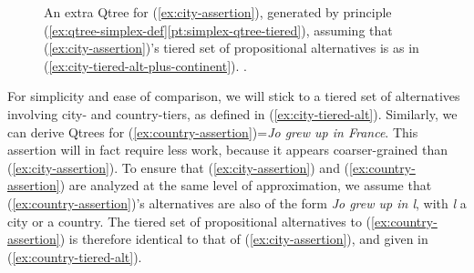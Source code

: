 \begin{exe}
	\label{ex:city-tiered-alt-plus-continent}
\end{exe} 

\begin{figure}[H]
	\centering
	\caption{An extra Qtree for (\ref{ex:city-assertion}), generated by principle (\ref{ex:qtree-simplex-def}\ref{pt:simplex-qtree-tiered}), assuming that (\ref{ex:city-assertion})'s tiered set of propositional alternatives is as in (\ref{ex:city-tiered-alt-plus-continent}). .}\label{fig:city-qtree-tiered-plus-continent}
\end{figure}

For simplicity and ease of comparison, we will stick to a tiered set of alternatives involving city- and country-tiers, as defined in (\ref{ex:city-tiered-alt}). Similarly, we can derive Qtrees for (\ref{ex:country-assertion})=\textit{Jo grew up in France}. This assertion will in fact require less work, because it appears coarser-grained than (\ref{ex:city-assertion}). To ensure that (\ref{ex:city-assertion}) and (\ref{ex:country-assertion}) are analyzed at the same level of approximation, we assume that (\ref{ex:country-assertion})'s alternatives are also of the form \textit{Jo grew up in l}, with \textit{l} a city or a country. The tiered set of propositional alternatives to (\ref{ex:country-assertion}) is therefore identical to that of (\ref{ex:city-assertion}), and given in (\ref{ex:country-tiered-alt}).

